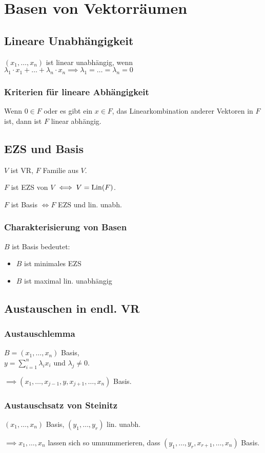\section*{Basen von Vektorräumen}

\subsection*{Lineare Unabhängigkeit}
$(x_1, \dots, x_n)$ ist linear unabhängig, wenn \\
$\lambda_1\cdot x_1 + \dots + \lambda_n \cdot x_n \implies \lambda_1 = \dots = \lambda_n = 0$

\subsubsection*{Kriterien für lineare Abhängigkeit}
Wenn $0\in F$ oder es gibt ein $x\in F$, das Linearkombination anderer Vektoren in $F$ ist, dann ist $F$ linear abhängig.

\subsection*{EZS und Basis}
$V$ ist VR, $F$ Familie aus $V$.

$F$ ist EZS von $V$ $\iff V=\operatorname{Lin}(F)$.

$F$ ist Basis $\iff F$ EZS und lin. unabh. 

\subsubsection*{Charakterisierung von Basen}
$B$ ist Basis bedeutet:
\begin{itemize}
	\item $B$ ist minimales EZS
	\item $B$ ist maximal lin. unabhängig
\end{itemize}

\subsection*{Austauschen in endl. VR}
\subsubsection*{Austauschlemma}
$B=(x_1,\dots,x_n)$ Basis, \\
$\displaystyle y=\sum_{i=1}^n \lambda_i x_i$ und $\lambda_j \neq 0$.

$\implies (x_1,\dots,x_{j-1},y,x_{j+1},\dots,x_n)$ Basis.

\subsubsection*{Austauschsatz von Steinitz}
$(x_1,\dots,x_n)$ Basis, $(y_1,\dots,y_r)$ lin. unabh.

$\implies x_1,\dots,x_n$ lassen sich so umnummerieren,
dass $(y_1,\dots,y_r,x_{r+1},\dots,x_n)$ Basis.
